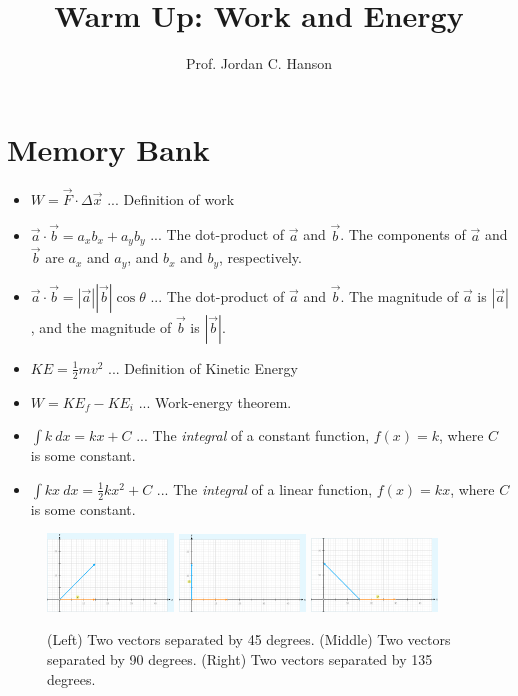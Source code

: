 \documentclass{article}
\begin{document}
\small
\title{Warm Up: Work and Energy}
\author{Prof. Jordan C. Hanson}

\maketitle

\section{Memory Bank}

\begin{itemize}
\item $W = \vec{F} \cdot \Delta \vec{x}$ ... Definition of work
\item $\vec{a} \cdot \vec{b} = a_x b_x + a_y b_y$ ... The dot-product of $\vec{a}$ and $\vec{b}$. The components of $\vec{a}$ and $\vec{b}$ are $a_x$ and $a_y$, and $b_x$ and $b_y$, respectively.
\item $\vec{a} \cdot \vec{b} = |\vec{a}| |\vec{b}| \cos\theta$ ... The dot-product of $\vec{a}$ and $\vec{b}$.  The magnitude of $\vec{a}$ is $|\vec{a}|$, and the magnitude of $\vec{b}$ is $|\vec{b}|$.
\item $KE = \frac{1}{2}m v^2$ ... Definition of Kinetic Energy
\item $W = KE_f - KE_i$ ... Work-energy theorem.
\item $\int k ~ dx = kx + C$ ... The \textit{integral} of a constant function, $f(x) = k$, where $C$ is some constant.
\item $\int k x ~ dx = \frac{1}{2}k x^2 + C$ ... The \textit{integral} of a linear function, $f(x) = kx$, where $C$ is some constant.
\end{itemize}

\begin{figure}
\centering
\includegraphics[width=0.3\textwidth,trim=0cm 0cm 3cm 0cm,clip=true]{figures/vec1.png}
\includegraphics[width=0.3\textwidth,trim=0cm 0cm 3cm 0cm,clip=true]{figures/vec2.png}
\includegraphics[width=0.3\textwidth,trim=0cm 0cm 3cm 0cm,clip=true]{figures/vec3.png}
\caption{\label{fig:1} (Left) Two vectors separated by 45 degrees. (Middle) Two vectors separated by 90 degrees. (Right) Two vectors separated by 135 degrees.}
\end{figure}
\end{document}
